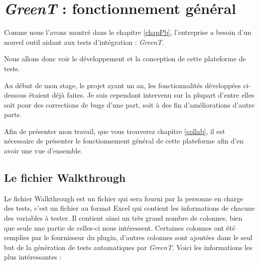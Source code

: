 \chapter{\textit{GreenT} : fonctionnement général}\label{chapGreent}
\putminitoc

Comme nous l'avons montré dans le chapitre \ref{chapPb}, l'entreprise a besoin d'un nouvel outil aidant aux tests d'intégration : \textit{GreenT}. 

Nous allons donc voir le développement et la conception de cette plateforme de tests.

Au début de mon stage, le projet ayant un an, les fonctionnalités développées ci-dessous étaient déjà faites. Je suis cependant intervenu
sur la plupart d'entre elles soit pour des corrections de bugs d'une part, soit à des fin d'améliorations d'autre parts.

Afin de présenter mon travail, que vous trouverez chapitre \ref{collab}, il est nécessaire de présenter le fonctionnement général de
cette plateforme afin d'en avoir une vue d'ensemble.

\section{Le fichier Walkthrough}\label{wt}
Le fichier Walkthrough est un fichier qui sera fourni par la personne en charge des tests, c'est un fichier au format Excel qui contient les informations
de chacune des variables à tester. Il contient ainsi un très grand nombre de colonnes, bien que seule une partie de celles-ci nous
intéressent. Certaines colonnes ont été remplies par le fournisseur du plugin, d'autres colonnes sont ajoutées dans le seul but de la
génération de tests automatiques par \textit{GreenT}. Voici les informations les plus intéressantes : 

